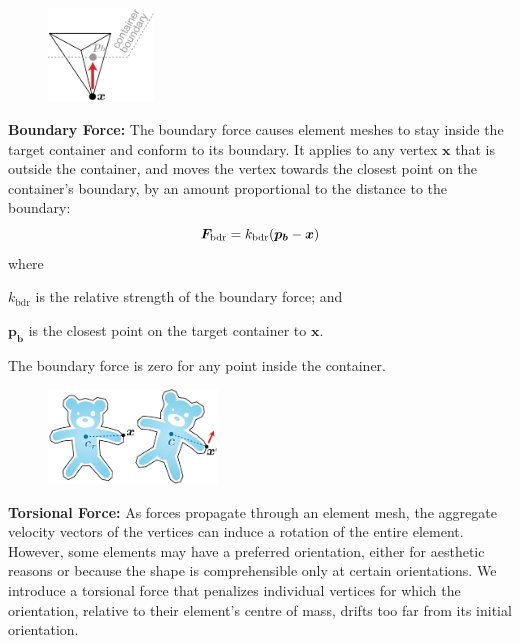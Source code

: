 \begin{figure}
\vspace{-15pt}
\centering
    \includegraphics[width=0.25\textwidth]{figures/repulsionpak/boundary_forces.pdf}
\end{figure}
\textbf{Boundary Force:}
The boundary force causes element meshes to stay inside the target container
and conform to its boundary. It applies to any vertex $\bm{x}$ that
is outside the container, and moves the vertex towards the closest point
on the container's boundary, by an amount proportional to the distance to
the boundary:
\begin{equation}
\bm{F}_\mathrm{bdr} = k_\mathrm{bdr} (\bm{p_b} - \bm{x})
\end{equation}
where
\begin{packeddescriptions}
	\item[$k_\mathrm{bdr}$] is the relative strength of the boundary force; and
	\item[$\bm{p_b}$] is the closest point on the target container to $\bm{x}$.
\end{packeddescriptions}

The boundary force is zero for any point inside the container.

\bigskip

\begin{figure}
\vspace{-15pt}
\centering
    \includegraphics[width=0.4\textwidth]{figures/repulsionpak/torsional_forces.pdf}
\end{figure}
\textbf{Torsional Force:} 
As forces propagate through an element mesh, the aggregate velocity
vectors of the vertices can induce a rotation of the entire element.
However, some elements may have a preferred orientation,
either for aesthetic reasons or because the shape is comprehensible only at certain orientations.
We introduce a torsional force that
penalizes individual vertices for which the orientation, relative to their
element's centre of mass, drifts too far from its initial orientation.

